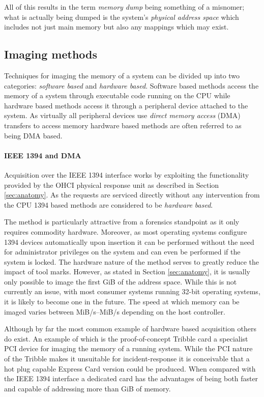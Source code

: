 \documentclass[numbers=noenddot,      %
               abstract,              %
               captions=tableheading, %
               DIV=8]                 %
              {scrartcl}
\begin{document}
All of this results in the term \emph{memory dump} being something of a
misnomer; what is actually being dumped is the system's \emph{physical
  address space} which includes not just main memory but also any
mappings which may exist.

\subsection{Imaging methods}
\label{sec:imagingmethods}

Techniques for imaging the memory of a system can be divided up into two
categories: \emph{software based} and \emph{hardware based}. Software
based methods access the memory of a system through executable code
running on the CPU while hardware based methods access it through a
peripheral device attached to the system. As virtually all peripheral
devices use \emph{direct memory access} (DMA) transfers to access memory
hardware based methods are often referred to as being DMA based.

\paragraph{IEEE 1394 and DMA}
Acquisition over the IEEE 1394 interface works by exploiting the
functionality provided by the OHCI physical response unit as described
in Section \ref{sec:anatomy}. As the requests are serviced directly
without any intervention from the CPU 1394 based methods are considered
to be \emph{hardware based}.

The method is particularly attractive from a forensics standpoint as it
only requires commodity hardware. Moreover, as most operating systems
configure 1394 devices automatically upon insertion it can be performed
without the need for administrator privileges on the system and can even
be performed if the system is locked. The hardware nature of the method
serves to greatly reduce the impact of tool marks. However, as stated in
Section \ref{sec:anatomy}, it is usually only possible to image the
first \unit[4]{GiB} of the address space. While this is not currently an
issue, with most consumer systems running 32-bit operating systems, it
is likely to become one in the future. The speed at which memory can be
imaged varies between \unit[20]{MiB/s}--\unit[35]{MiB/s} depending on
the host controller.

Although by far the most common example of hardware based acquisition
others do exist. An example of which is the proof-of-concept Tribble card
\citep{carrier04} a specialist PCI device for imaging the memory of a
running system. While the PCI nature of the Tribble makes it unsuitable
for incident-response it is conceivable that a hot plug capable Express
Card version could be produced. When compared with the IEEE 1394
interface a dedicated card has the advantages of being both faster and
capable of addressing more than \unit[4]{GiB} of memory.
\end{document}
